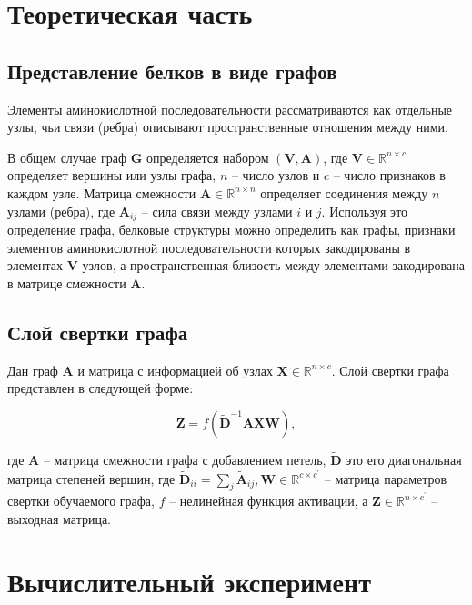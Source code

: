 \documentclass[12pt,twosides]{article}
\begin{document}
	
	
	\section{Теоретическая часть}
	
		\subsection{Представление белков в виде графов}
	  Элементы аминокислотной последовательности рассматриваются как отдельные узлы, чьи связи (ребра) описывают пространственные отношения между ними. 
	
	В общем случае граф $\mathbf{G}$ определяется набором $\mathbf{(V, A)}$, где $\mathbf{V}\in \mathbb{R}^{n \times c}$ определяет вершины или узлы графа, $n$ – число узлов и $c$ – число признаков в каждом узле. Матрица смежности $\mathbf{A}\in \mathbb{R}^{n \times n}$ определяет соединения между $n$ узлами (ребра), где $\mathbf{A}_{ij}$ – сила связи между узлами $i$ и $j$. Используя это определение графа, белковые структуры можно определить как графы, признаки элементов аминокислотной последовательности которых закодированы в элементах $\mathbf{V}$ узлов, а пространственная близость между элементами закодирована в матрице смежности $\mathbf{A}$.
	
		\subsection{Слой свертки графа}
	Дан граф $\mathbf{A}$ и матрица с информацией об узлах $\mathbf{X} \in \mathbb{R}^{n \times c}$.  Слой свертки графа представлен в следующей форме:
	
	$$\mathbf{Z}=f\left(\tilde{\mathbf{D}}^{-1} \mathbf{A} \mathbf{X} \mathbf{W}\right),$$
	
	где $\mathbf{A}$ – матрица смежности графа с добавлением петель, $\tilde{\mathbf{D}}$ это его диагональная матрица степеней вершин, где $\tilde{\mathbf{D}}_{i i}=\sum_{j} \tilde{\mathbf{A}}_{i j}, \mathbf{W} \in \mathbb{R}^{c \times c^{\prime}}$ – матрица параметров свертки обучаемого графа, $f$ – нелинейная функция активации, а $\mathbf{Z} \in \mathbb{R}^{n \times c^{\prime}}$ – выходная матрица.
	
		
	\section{Вычислительный эксперимент}
		
\end{document}
